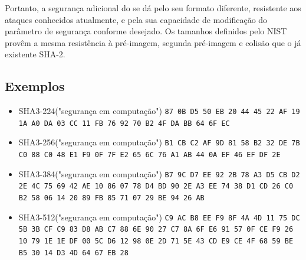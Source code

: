 Portanto, a segurança adicional do \Keccak se dá pelo seu formato diferente,
resistente aos ataques conhecidos atualmente, e pela sua capacidade de
modificação do parâmetro de segurança conforme desejado. Os tamanhos definidos
pelo NIST provêm a mesma resistência à pré-imagem, segunda pré-imagem e colisão
que o já existente SHA-2.

\subsection{Exemplos}

\begin{itemize}
    \item SHA3-224("segurança em computação") \newline
        \texttt{87 0B D5 50 EB 20 44 45 22 AF 19 1A A0 DA 03 CC 11 FB 76 92 70 B2 4F DA BB 64 6F EC} \newline
    \item SHA3-256("segurança em computação") \newline
        \texttt{B1 CB C2 AF 9D 81 58 B2 32 DE 7B C0 88 C0 48 E1 F9 0F 7F E2 65 6C 76 A1 AB 44 0A EF 46 EF DF 2E} \newline
    \item SHA3-384("segurança em computação") \newline
        \texttt{B7 9C D7 EE 92 2B 78 A3 D5 CB D2 2E 4C 75 69 42 AE 10 86 07 78 D4 BD 90 2E A3 EE 74 38 D1 CD 26 C0 B2 58 06 14 20 89 FB 85 71 07 29 BE 94 26 AB} \newline
    \item SHA3-512("segurança em computação") \newline
        \texttt{C9 AC B8 EE F9 8F 4A 4D 11 75 DC 5B 3B CF C9 83 D8 AB C7 88 6E 90 27 C7 8A 6F E6 91 57 0F CE F9 26 10 79 1E 1E DF 00 5C D6 12 98 0E 2D 71 5E 43 CD E9 CE 4F 68 59 BE B5 30 14 D3 4D 64 67 EB 28}
\end{itemize}

\let\thesubsection\oldsubsection%
